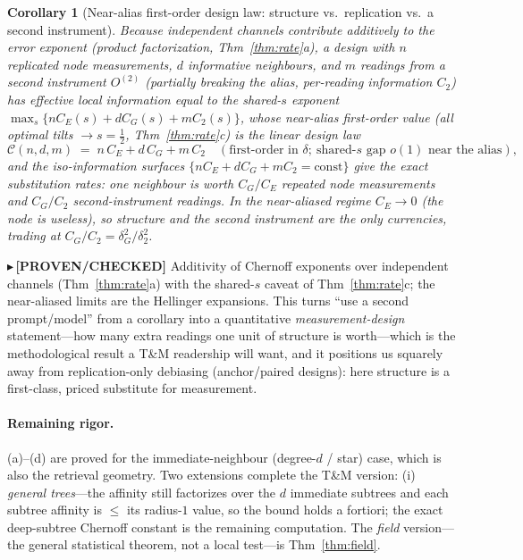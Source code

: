 \documentclass[11pt]{article}
\newtheorem{corollary}{Corollary}
\newcommand{\PROVEN}[1]{{\color{teal}\small$\blacktriangleright$\,\textbf{[PROVEN/CHECKED]} #1}}
\begin{document}
\begin{corollary}[Near-alias first-order design law: structure vs.\ replication vs.\ a second instrument]\label{cor:design}
Because independent channels contribute \emph{additively} to the error exponent (product factorization,
Thm~\ref{thm:rate}a), a design with $n$ replicated node measurements, $d$ informative neighbours, and $m$ readings
from a second instrument $O^{(2)}$ (partially breaking the alias, per-reading information $C_2$) has effective
local information equal to the shared-$s$ exponent $\max_s\{n C_E(s)+d C_G(s)+m C_2(s)\}$, whose
\emph{near-alias first-order} value (all optimal tilts $\to s{=}\tfrac12$, Thm~\ref{thm:rate}c) is the linear
design law
\[
   \mathcal C(n,d,m)\;=\;n\,C_E+d\,C_G+m\,C_2\quad(\text{first-order in }\delta;\ \text{shared-}s\text{ gap }o(1)\text{ near the alias}),
\]
and the \emph{iso-information surfaces} $\{n C_E+d C_G+m C_2=\text{const}\}$ give the exact substitution rates: one
neighbour is worth $C_G/C_E$ repeated node measurements and $C_G/C_2$ second-instrument readings. In the
near-aliased regime $C_E\to0$ (the node is useless), so structure and the second instrument are the \emph{only}
currencies, trading at $C_G/C_2=\delta_G^2/\delta_2^2$.
\end{corollary}
\PROVEN{Additivity of Chernoff exponents over independent channels (Thm~\ref{thm:rate}a) with the shared-$s$
caveat of Thm~\ref{thm:rate}c; the near-aliased limits are the Hellinger expansions.} This turns ``use a second
prompt/model'' from a corollary into a quantitative \emph{measurement-design} statement---how many extra readings
one unit of structure is worth---which is the methodological result a T\&M readership will want, and it positions
us squarely away from replication-only debiasing (anchor/paired designs): here structure is a first-class,
priced substitute for measurement.

\paragraph{Remaining rigor.} (a)--(d) are proved for the immediate-neighbour (degree-$d$ / star) case, which is
also the retrieval geometry. Two extensions complete the T\&M version: (i) \emph{general trees}---the affinity
still factorizes over the $d$ immediate subtrees and each subtree affinity is $\le$ its radius-$1$ value, so the
bound holds a fortiori; the exact deep-subtree Chernoff constant is the remaining computation. The
\emph{field} version---the general statistical theorem, not a local test---is Thm~\ref{thm:field}.
\end{document}
